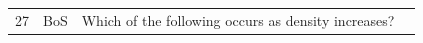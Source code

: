 \documentclass[10pt]{article}
\begin{document}
\begin{tiny}
\begin{longtable}{r p{0.3in} p{1.212in} p{3.8in}}
    27 &          BoS &                                                                                                                                                                                                                              Which of the following occurs as density increases? &                                                                                                                                                                                                                                                                                                                                                                                                                                                                                                                                                                                                                                                                                                                                                                                                                                                                                                                                                                                                                                                                                                                                                                                                                                                                                                                                                                                                                                                                                                                                                                                                                                                                                                                                                                                                                                                                                                                                                                                                                                                                                                                                                                                                                                                                                                                                                                                                                                                                                                                                                                                                                                                                                                                                                                                                                                                                                                                                                                                                                                                                                               
\end{longtable}
\end{tiny}
\end{document}
